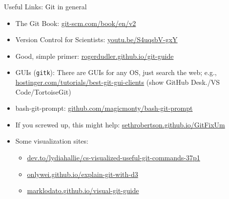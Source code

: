 \documentclass[aspectratio=169]{beamer}
\newcommand{\code}[1]{\texttt{\color{mygreen}#1}}
\begin{document}
\begin{frame}
  {Useful Links: Git in general}
  \begin{itemize}\itemsep.5em
    \item The Git Book:
      \href{https://git-scm.com/book/en/v2}{git-scm.com/book/en/v2}
    \item Version Control for Scientists:
      \href{https://youtu.be/S4uqsbV-gxY}{youtu.be/S4uqsbV-gxY}
    \item Good, simple primer:
      \href{https://rogerdudler.github.io/git-guide/}%
      {rogerdudler.github.io/git-guide}
    \item GUIs (\code{gitk}): There are GUIs for any OS, just search the web;
      e.g., \href{https://www.hostinger.com/tutorials/best-git-gui-clients/}%
      {hostinger.com/tutorials/best-git-gui-clients}
      {\footnotesize(show GitHub Desk./VS Code/TortoiseGit)}
    \item bash-git-prompt:
      \href{https://github.com/magicmonty/bash-git-prompt}%
      {github.com/magicmonty/bash-git-prompt}
    \item If you screwed up, this might help:
      \href{https://sethrobertson.github.io/GitFixUm/fixup.html}%
      {sethrobertson.github.io/GitFixUm}
    \item Some visualization sites:
      \begin{itemize}
        \item \href{https://dev.to/lydiahallie/cs-visualized-useful-git-commands-37p1}%
      {dev.to/lydiahallie/cs-visualized-useful-git-commands-37p1}
        \item \href{http://onlywei.github.io/explain-git-with-d3}%
            {onlywei.github.io/explain-git-with-d3}
        \item \href{https://marklodato.github.io/visual-git-guide}%
            {marklodato.github.io/visual-git-guide}
      \end{itemize}
  \end{itemize}
\end{frame}
\end{document}
